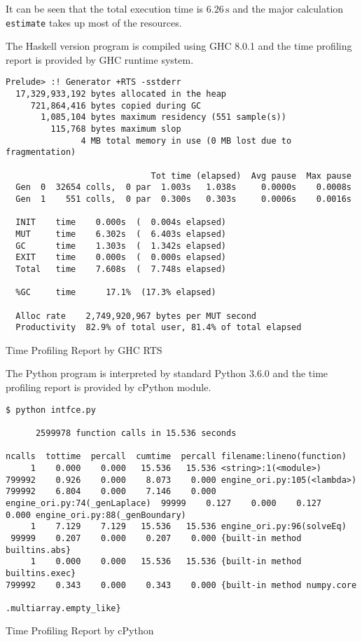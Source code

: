 \documentclass[11pt]{article}
\begin{document}
It can be seen that the total execution time is $6.26\,\mathrm{s}$ and the major calculation \lstinline{estimate} takes up most of the resources.

\newpage 

The Haskell version program is compiled using GHC 8.0.1 and the time profiling report is provided by GHC runtime system.
\vspace{-10pt}
\begin{table}[H]
\setlength\abovecaptionskip{0pt}
\begin{lstlisting}
Prelude> :! Generator +RTS -sstderr
  17,329,933,192 bytes allocated in the heap
     721,864,416 bytes copied during GC
       1,085,104 bytes maximum residency (551 sample(s))
         115,768 bytes maximum slop
               4 MB total memory in use (0 MB lost due to fragmentation)

                             Tot time (elapsed)  Avg pause  Max pause
  Gen  0  32654 colls,  0 par  1.003s   1.038s     0.0000s    0.0008s
  Gen  1    551 colls,  0 par  0.300s   0.303s     0.0006s    0.0016s

  INIT    time    0.000s  (  0.004s elapsed)
  MUT     time    6.302s  (  6.403s elapsed)
  GC      time    1.303s  (  1.342s elapsed)
  EXIT    time    0.000s  (  0.000s elapsed)
  Total   time    7.608s  (  7.748s elapsed)

  %GC     time      17.1%  (17.3% elapsed)

  Alloc rate    2,749,920,967 bytes per MUT second
  Productivity  82.9% of total user, 81.4% of total elapsed
\end{lstlisting}
\caption{Time Profiling Report by GHC RTS}
\end{table}

The Python program is interpreted by standard Python 3.6.0 and the time profiling report is provided by cPython module.

\begin{table}[H]
\setlength\abovecaptionskip{0pt}
\begin{lstlisting}
$ python intfce.py

      2599978 function calls in 15.536 seconds

ncalls  tottime  percall  cumtime  percall filename:lineno(function)
     1    0.000    0.000   15.536   15.536 <string>:1(<module>)
799992    0.926    0.000    8.073    0.000 engine_ori.py:105(<lambda>)
799992    6.804    0.000    7.146    0.000 engine_ori.py:74(_genLaplace)  99999    0.127    0.000    0.127    0.000 engine_ori.py:88(_genBoundary)
     1    7.129    7.129   15.536   15.536 engine_ori.py:96(solveEq)
 99999    0.207    0.000    0.207    0.000 {built-in method builtins.abs}
     1    0.000    0.000   15.536   15.536 {built-in method builtins.exec}
799992    0.343    0.000    0.343    0.000 {built-in method numpy.core
                                                .multiarray.empty_like}
\end{lstlisting}
\caption{Time Profiling Report by cPython}
\end{table}
\end{document}
